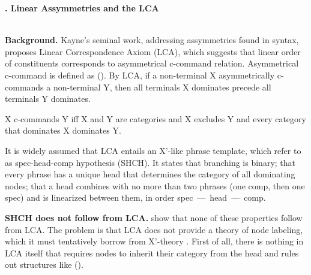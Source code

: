 \documentclass[a4paper, 12pt]{article}
\begin{document}
\begin{sloppypar}

{\large \textbf{\cite{abels2012linearasymmetrieslca}. Linear Assymmetries and the LCA}}
\\~

\textbf{Background.} Kayne’s \parencite*{kayne1994antisymmetrysyntax} seminal work, addressing assymmetries found in syntax, proposes Linear Correspondence Axiom (LCA), which suggests that linear order of constituents corresponds to asymmetrical c-command relation. Asymmetrical c-command is defined as (\nextx). By LCA, if a non-terminal X asymmetrically c-commands a non-terminal Y, then all terminals X dominates precede all terminals Y dominates.

\ex
    X c-commands Y iff X and Y are categories and X excludes Y and every category that dominates X dominates Y.
\xe

It is widely assumed \parencite[e.g.][]{cinque2005derivinggreenberguniversal} that LCA entails an X'-like phrase template, which \textcite{abels2012linearasymmetrieslca} refer to as spec-head-comp hypothesis (SHCH). It states that branching is binary; that every phrase has a unique head that determines the category of all dominating nodes; that a head combines with no more than two phrases (one comp, then one spec) and is linearized between them, in order spec~---~head~---~comp.


\textbf{SHCH does not follow from LCA.} \textcite{abels2012linearasymmetrieslca} show that none of these properties follow from LCA. The problem is that LCA does not provide a theory of node labeling, which it must tentatively borrow from X'-theory \parencite[cf.][414]{chomsky1995}. First of all, there is nothing in LCA itself that requires nodes to inherit their category from the head and rules out structures like (\nextx).


\end{sloppypar}
\end{document}
